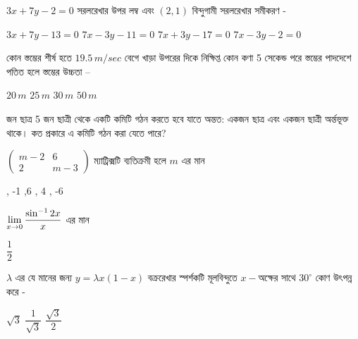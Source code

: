 \documentclass[addpoints]{exam}
\begin{document}
\begin{questions}

 \question  $ 3x+7y-2=0 $ সরলরেখার উপর লম্ব এবং $ (2,1) $ বিন্দুগামী সরলরেখার সমীকরণ -

\begin{oneparchoices}
\choice $ 3x+7y-13=0 $
\choice $ 7x-3y-11=0 $
\choice $ 7x+3y-17=0 $
\choice $ 7x-3y-2 =0 $
\end{oneparchoices}

\question  কোন স্তম্ভের শীর্ষ হতে $ 19.5\,m/sec $ বেগে খাড়া উপরের দিকে নিক্ষিপ্ত কোন কণা 5 সেকেন্ড পরে স্তম্ভের পাদদেশে পতিত হলে স্তম্ভের উচ্চতা – 

\begin{oneparchoices}
\choice $ 20\,m$
\choice $ 25\,m$
\choice $ 30\,m $
\choice $ 50\,m $
\end{oneparchoices}

 জন ছাত্র 5 জন ছাত্রী থেকে একটি কমিটি গঠন করতে হবে যাতে অন্তত: একজন ছাত্র এবং একজন ছাত্রী অর্ন্তভূক্ত থাকে। কত প্রকারে এ কমিটি গঠন করা যেতে পারে?

\begin{oneparchoices}

\end{oneparchoices}

\question  $\begin{pmatrix}
m-2 & 6 \\
2 & m-3
\end{pmatrix} $ ম্যাট্রিক্সটি ব্যতিক্রমী হলে $ m $ এর মান

\begin{oneparchoices}
, -1
,6
, 4
, -6
\end{oneparchoices}

\question  $ \mathlarger{\lim_{x\to 0} \dfrac{\sin^{-1}2x}{x}} $ এর মান

\begin{oneparchoices}
\choice $ \dfrac{1}{2} $
\end{oneparchoices}

\question  $ \lambda $ এর যে মানের জন্য $ y=\lambda x(1-x) $ বক্ররেখার স্পর্শকটি মূলবিন্দুতে $ x- $অক্ষের সাথে $ 30^{\circ} $ কোণ উৎপন্ন করে -

\begin{oneparchoices}
\choice $ \sqrt{3} $
\choice $ \dfrac{1}{\sqrt{3}} $
\choice  $ \dfrac{\sqrt{3}}{2} $

\end{oneparchoices}


\end{questions}
\end{document}
